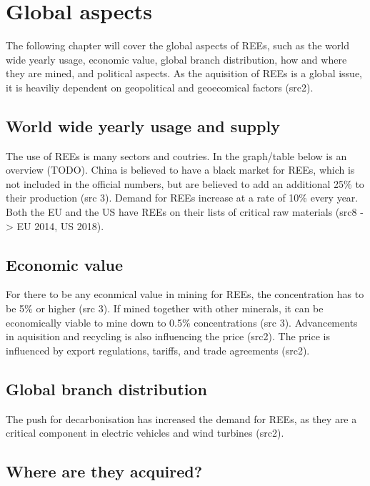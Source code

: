 
\section{Global aspects}

The following chapter will cover the global aspects of REEs, such as the world wide yearly usage, economic value, global branch distribution, how and where they are mined, and political aspects. As the aquisition of REEs is a global issue, it is heaviliy dependent on geopolitical and  geoecomical factors (src2).

\subsection{World wide yearly usage and supply}

The use of REEs is many sectors and coutries. In the graph/table below is an overview (TODO). China is believed to have a black market for REEs, which is not included in the official numbers, but are believed to add an additional 25\% to their production (src 3). Demand for REEs increase at a rate of 10\% every year. Both the EU and the US have REEs on their lists of critical raw materials (src8 -> EU 2014, US 2018).

\subsection{Economic value}

For there to be any econmical value in mining for REEs, the concentration has to be 5\% or higher (src 3). If mined together with other minerals, it can be economically viable to mine down to 0.5\% concentrations (src 3). Advancements in aquisition and recycling is also influencing the price (src2). The price is influenced by export regulations, tariffs, and trade agreements (src2).

\subsection{Global branch distribution}

The push for decarbonisation has increased the demand for REEs, as they are a critical component in electric vehicles and wind turbines (src2).

\subsection{Where are they acquired?}

